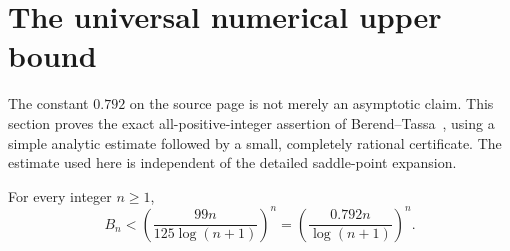 \section{The universal numerical upper bound}\label{sec:universal-bound}

The constant $0.792$ on the source page is not merely an asymptotic claim.
This section proves the exact all-positive-integer assertion of
Berend--Tassa~\cite{berend-tassa}, using a simple analytic estimate followed
by a small, completely rational certificate.  The estimate used here is
independent of the detailed saddle-point expansion.

\begin{theorem}\label{thm:0792}
For every integer $n\ge1$,
\begin{equation}\label{eq:0792}
 B_n<\left(\frac{99n}{125\log(n+1)}\right)^n
     =\left(\frac{0.792n}{\log(n+1)}\right)^n.
\end{equation}
\end{theorem}
